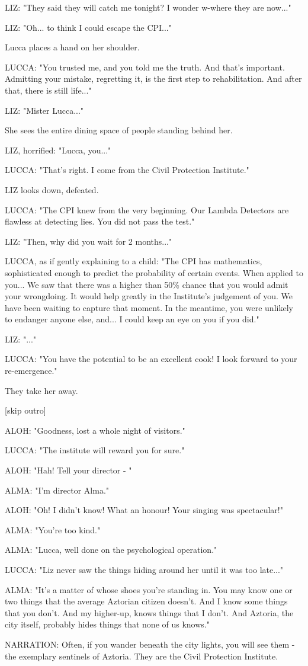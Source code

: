 \documentclass[11pt]{article}
\begin{document}
LIZ: "They said they will catch me tonight?
I wonder w-where they are now..."

LIZ: "Oh... to think I could escape the CPI..."

Lucca places a hand on her shoulder.

LUCCA: "You trusted me, and you told me the truth.
And that's important.
Admitting your mistake, regretting it, is the first step to rehabilitation.
And after that, there is still life..."

LIZ: "Mister Lucca..."

She sees the entire dining space of people standing behind her.

LIZ, horrified: "Lucca, you..."

LUCCA: "That's right. I come from the Civil Protection Institute."

LIZ looks down, defeated.

LUCCA: "The CPI knew from the very beginning. 
Our Lambda Detectors are flawless at detecting lies. 
You did not pass the test."

LIZ: "Then, why did you wait for 2 months..."

LUCCA, as if gently explaining to a child: "The CPI has mathematics, sophisticated enough to predict the probability of certain events.
When applied to you...
We saw that there was a higher than 50\% chance that you would admit your wrongdoing.
It would help greatly in the Institute's judgement of you.
We have been waiting to capture that moment.
In the meantime, you were unlikely to endanger anyone else, and... I could keep an eye on you if you did."

LIZ: "..."

LUCCA: "You have the potential to be an excellent cook!
I look forward to your re-emergence."

They take her away.

[skip outro]

ALOH: "Goodness, lost a whole night of visitors."

LUCCA: "The institute will reward you for sure."

ALOH: "Hah! Tell your director - "

ALMA: "I'm director Alma."

ALOH: "Oh! I didn't know! What an honour! Your singing was spectacular!"

ALMA: "You're too kind."

ALMA: "Lucca, well done on the psychological operation."

LUCCA: "Liz never saw the things hiding around her until it was too late..."

ALMA: "It's a matter of whose shoes you're standing in.
You may know one or two things that the average Aztorian citizen doesn't. And I know some things that you don't.
And my higher-up, knows things that I don't.
And Aztoria, the city itself, probably hides things that none of us knows."

NARRATION:
Often, if you wander beneath the city lights, you will see them -
the exemplary sentinels of Aztoria.
They are the Civil Protection Institute.
\end{document}
